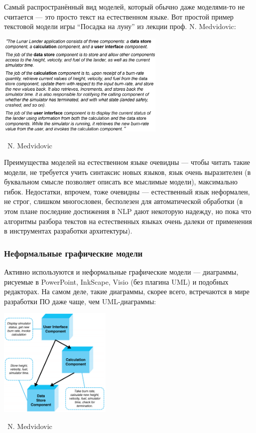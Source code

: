 \documentclass[a5paper]{article}
\newcommand{\attribution}[1] {
	\vspace{-5mm}\begin{flushright}\begin{scriptsize}%
	{\textcopyright\, #1}\end{scriptsize}\end{flushright}
}
\begin{document}
Самый распространённый вид моделей, который обычно даже моделями-то не считается --- это просто текст на естественном языке. Вот простой пример текстовой модели игры ``Посадка на луну'' из лекции проф. N. Medvidovic:

\begin{center}
	\includegraphics[width=0.6\textwidth]{naturalLanguage.png}
	\attribution{N. Medvidovic}
\end{center}

Преимущества моделей на естественном языке очевидны --- чтобы читать такие модели, не требуется учить синтаксис новых языков, язык очень выразителен (в буквальном смысле позволяет описать все мыслимые модели), максимально гибок. Недостатки, впрочем, тоже очевидны --- естественный язык неформален, не строг, слишком многословен, бесполезен для автоматической обработки (в этом плане последние достижения в NLP дают некоторую надежду, но пока что алгоритмы разбора текстов на естественных языках очень далеки от применения в инструментах разработки архитектуры).

\subsubsection{Неформальные графические модели}

Активно используются и неформальные графические модели --- диаграммы, рисуемые в PowerPoint, InkScape, Visio (без плагина UML) и подобных редакторах. На самом деле, такие диаграммы, скорее всего, встречаются в мире разработки ПО даже чаще, чем UML-диаграммы:

\begin{center}
	\includegraphics[width=0.4\textwidth]{informalModel.png}
	\attribution{N. Medvidovic}
\end{center}
\end{document}
